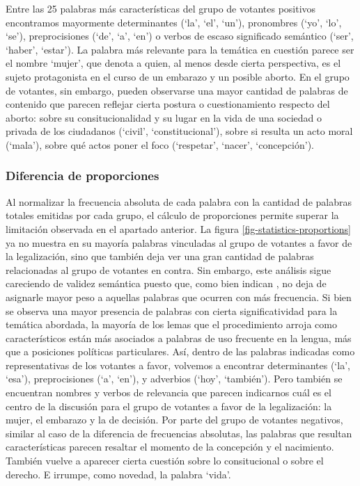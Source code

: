 Entre las 25 palabras m\'as caracter\'isticas del grupo de votantes positivos
encontramos mayormente determinantes (`la', `el', `un'), pronombres 
(`yo', `lo', `se'), preprocisiones (`de', `a', `en') o verbos de escaso
significado sem\'antico (`ser', `haber', `estar'). La palabra m\'as relevante
para la tem\'atica en cuesti\'on parece ser el nombre `mujer', que denota a
quien, al menos desde cierta perspectiva, es el
sujeto protagonista en el curso de un embarazo y un posible aborto. En el grupo
de votantes, sin embargo, pueden observarse una mayor cantidad de palabras
de contenido que parecen reflejar cierta
postura o cuestionamiento respecto del aborto: sobre su consitucionalidad
y su lugar en la vida de una sociedad o privada de los ciudadanos
(`civil', `constitucional'), sobre si resulta un acto moral (`mala'),
sobre qu\'e actos poner el foco (`respetar', `nacer', `concepci\'on').

\subsubsection{Diferencia de proporciones}
\label{subsubsec-results-proporcions}
Al normalizar la frecuencia absoluta de cada palabra con la cantidad
de palabras totales emitidas por cada grupo, el c\'alculo de proporciones permite
superar la limitaci\'on observada en el apartado anterior.
La figura \ref{fig-statistics-proportions} ya no muestra en su mayor\'ia palabras
vinculadas al grupo de votantes a favor de la legalizaci\'on, sino que tambi\'en
deja ver una gran cantidad de palabras relacionadas al grupo de votantes en contra.
Sin embargo, este an\'alisis sigue careciendo de validez sem\'antica puesto que, como bien
indican \cite{monroe2008fightin}, no deja de asignarle mayor peso a aquellas palabras
que ocurren con m\'as frecuencia. Si bien se observa una mayor presencia de palabras
con cierta significatividad para la tem\'atica abordada, la mayor\'ia de los lemas
que el procedimiento arroja como caracter\'isticos est\'an m\'as asociados a palabras
de uso frecuente en la lengua, m\'as que a posiciones pol\'iticas particulares. As\'i,
dentro de las palabras indicadas como representativas de los votantes a favor,
volvemos a encontrar determinantes (`la', `esa'), preprocisiones (`a', `en'),
y adverbios (`hoy', `tambi\'en'). Pero tambi\'en se encuentran nombres y verbos
de relevancia que parecen indicarnos cu\'al es el centro de la discusi\'on para el
grupo de votantes a favor de la legalizaci\'on: la mujer, el embarazo y la
de decisi\'on. Por parte del grupo de votantes negativos, similar al caso de
la diferencia de frecuencias absolutas, las palabras que resultan
caracter\'isticas parecen resaltar  el momento de la concepci\'on y el nacimiento.
Tambi\'en vuelve a aparecer cierta cuesti\'on sobre lo consitucional o sobre el derecho.
E irrumpe, como novedad, la palabra `vida'.

